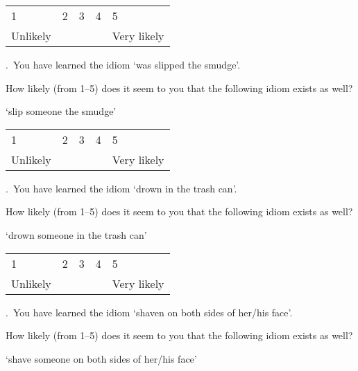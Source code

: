 \documentclass[output=paper]{langsci/langscibook}
\begin{document}
\noindent \begin{tabularx}{\textwidth}{XXXXX}
    1 & 2 & 3 & 4 & 5\\
    Unlikely & & & & Very likely\\
\end{tabularx}\vspace{1\baselineskip}

.\ You have learned the idiom \enquote*{{was slipped the smudge}}.

\noindent How likely (from 1--5) does it seem to you that the following idiom exists
    as well?\vspace{.5\baselineskip}

\noindent \enquote*{{slip someone the smudge}}\vspace{.5\baselineskip}

\noindent \begin{tabularx}{\textwidth}{XXXXX}
        1 & 2 & 3 & 4 & 5\\
        Unlikely & & & & Very likely\\
        \end{tabularx}\vspace{1\baselineskip}


.\ You have learned the idiom \enquote*{{drown in the trash can}}.

\noindent How likely (from 1--5) does it seem to you that the following idiom exists
    as well?\vspace{.5\baselineskip}

\noindent \enquote*{{drown someone in the trash can}}\vspace{.5\baselineskip}

\noindent \begin{tabularx}{\textwidth}{XXXXX}
        1 & 2 & 3 & 4 & 5\\
        Unlikely & & & & Very likely\\
        \end{tabularx}\vspace{1\baselineskip}


.\ You have learned the idiom \enquote*{{shaven on both sides of
    her/his face}}.

\noindent How likely (from 1--5) does it seem to you that the following idiom exists
    as well?\vspace{.5\baselineskip}

\noindent \enquote*{{shave someone on both sides of her/his face}}\vspace{.5\baselineskip}
\end{document}
